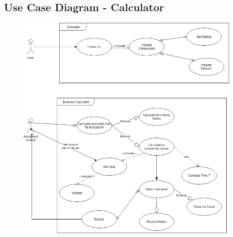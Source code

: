 \documentclass{article}
\begin{document}
\subsection{Use Case Diagram - Calculator}
\begin{figure}[h!]
    \centering
    \includegraphics[scale=0.55]{Problem5_UseCaseDiagram.png}
\end{figure}
\newpage
\end{document}
